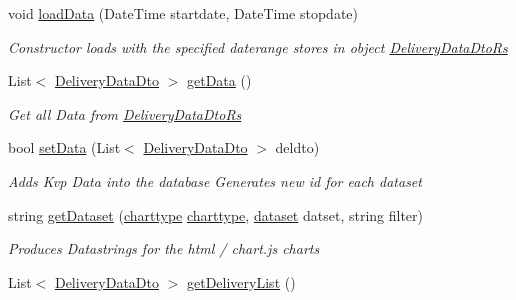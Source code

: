 \begin{DoxyCompactItemize}
void \hyperlink{classkpi_mvc_api_1_1_data_transfer_objects_1_1_delivery_data_dto_rs_aab956a92693af48a6da78eab193b9ca7}{load\+Data} (Date\+Time startdate, Date\+Time stopdate)
\begin{DoxyCompactList}\small\item\em Constructor loads with the specified daterange stores in object {\ttfamily \hyperlink{classkpi_mvc_api_1_1_data_transfer_objects_1_1_delivery_data_dto_rs}{Delivery\+Data\+Dto\+Rs}} \end{DoxyCompactList}\item 
List$<$ \hyperlink{classkpi_mvc_api_1_1_data_transfer_objects_1_1_delivery_data_dto}{Delivery\+Data\+Dto} $>$ \hyperlink{classkpi_mvc_api_1_1_data_transfer_objects_1_1_delivery_data_dto_rs_a7c771808f4607524b53ee7a65fec5119}{get\+Data} ()
\begin{DoxyCompactList}\small\item\em Get all Data from {\ttfamily \hyperlink{classkpi_mvc_api_1_1_data_transfer_objects_1_1_delivery_data_dto_rs}{Delivery\+Data\+Dto\+Rs}} \end{DoxyCompactList}\item 
bool \hyperlink{classkpi_mvc_api_1_1_data_transfer_objects_1_1_delivery_data_dto_rs_ab7a5599b20fc48614aa3245dc5ee8302}{set\+Data} (List$<$ \hyperlink{classkpi_mvc_api_1_1_data_transfer_objects_1_1_delivery_data_dto}{Delivery\+Data\+Dto} $>$ deldto)
\begin{DoxyCompactList}\small\item\em Adds Kvp Data into the database Generates new id for each dataset \end{DoxyCompactList}\item 
string \hyperlink{classkpi_mvc_api_1_1_data_transfer_objects_1_1_delivery_data_dto_rs_a73e5ded80e01f064d9c1e8911234e111}{get\+Dataset} (\hyperlink{classkpi_mvc_api_1_1_data_transfer_objects_1_1_delivery_data_dto_rs_a09a01f7e378bb8d705847ee3b4fd06f0}{charttype} \hyperlink{classkpi_mvc_api_1_1_data_transfer_objects_1_1_delivery_data_dto_rs_a09a01f7e378bb8d705847ee3b4fd06f0}{charttype}, \hyperlink{classkpi_mvc_api_1_1_data_transfer_objects_1_1_delivery_data_dto_rs_aae6559e3841d130771a24d8345f9a97c}{dataset} datset, string filter)
\begin{DoxyCompactList}\small\item\em Produces Datastrings for the html / chart.\+js charts \end{DoxyCompactList}\item 
List$<$ \hyperlink{classkpi_mvc_api_1_1_data_transfer_objects_1_1_delivery_data_dto}{Delivery\+Data\+Dto} $>$ \hyperlink{classkpi_mvc_api_1_1_data_transfer_objects_1_1_delivery_data_dto_rs_a6442a0812dac20aff0dd6082a18c7024}{get\+Delivery\+List} ()

\end{DoxyCompactItemize}
